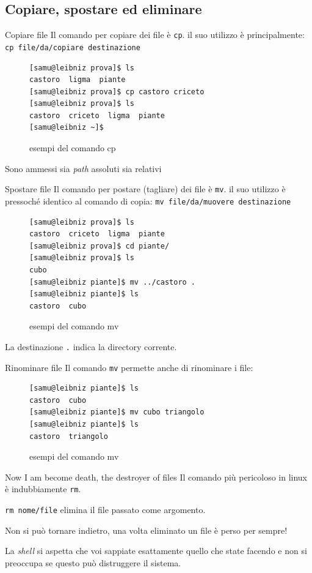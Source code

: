 \documentclass{beamer}
\begin{document}
\subsection{Copiare, spostare ed eliminare}
\begin{frame}[fragile]{Copiare file}
  Il comando per copiare dei file è \texttt{cp}. il suo utilizzo è 
  principalmente: \texttt{cp file/da/copiare destinazione}
  \begin{figure}
    \begin{lstlisting}[basicstyle=\small]
[samu@leibniz prova]$ ls
castoro  ligma  piante
[samu@leibniz prova]$ cp castoro criceto
[samu@leibniz prova]$ ls
castoro  criceto  ligma  piante
[samu@leibniz ~]$
    \end{lstlisting}
    \caption{esempi del comando cp}
  \end{figure}
  Sono ammessi sia \textit{path} assoluti sia relativi
\end{frame}

\begin{frame}[fragile]{Spostare file}
  Il comando per postare (tagliare) dei file è \texttt{mv}. il suo utilizzo è 
  pressoché identico al comando di copia: \texttt{mv file/da/muovere 
  destinazione}
  \begin{figure}
    \begin{lstlisting}[basicstyle=\small]
[samu@leibniz prova]$ ls
castoro  criceto  ligma  piante
[samu@leibniz prova]$ cd piante/
[samu@leibniz prova]$ ls
cubo
[samu@leibniz piante]$ mv ../castoro .
[samu@leibniz piante]$ ls
castoro  cubo
    \end{lstlisting}
    \caption{esempi del comando mv}
  \end{figure}
  La destinazione \texttt{.} indica la directory corrente.
\end{frame}

\begin{frame}[fragile]{Rinominare file}
  Il comando \texttt{mv} permette anche di rinominare i file:
  \begin{figure}
    \begin{lstlisting}[basicstyle=\normalsize]
[samu@leibniz piante]$ ls
castoro  cubo
[samu@leibniz piante]$ mv cubo triangolo
[samu@leibniz piante]$ ls
castoro  triangolo
    \end{lstlisting}
    \caption{esempi del comando mv}
  \end{figure}
\end{frame}

\begin{frame}{Now I am become death, the destroyer of files}
  Il comando più pericoloso in linux è indubbiamente \texttt{rm}.\bigskip

  \texttt{rm nome/file} elimina il file passato come argomento.\bigskip

  Non si può tornare indietro, una volta eliminato un file è perso per 
  sempre!\bigskip

  La \textit{shell} si aspetta che voi sappiate esattamente quello che state 
  facendo e non si preoccupa se questo può distruggere il sistema.
\end{frame}
\end{document}
